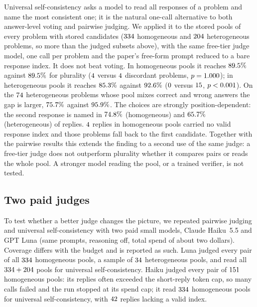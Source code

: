 \documentclass[preprint,11pt,number,sort&compress]{elsarticle}
\begin{document}
Universal self-consistency \citep{chen2023usc} asks a model to read all responses of a problem and name the
most consistent one; it is the natural one-call alternative to both answer-level voting and pairwise
judging. We applied it to the stored pools of every problem with stored candidates ($334$
homogeneous and $204$ heterogeneous problems, so more than the judged subsets above), with the same free-tier judge model, one call per problem and
the paper's free-form prompt reduced to a bare response index. It does not beat voting. In homogeneous
pools it reaches $89.5\%$ against $89.5\%$ for plurality ($4$ versus $4$ discordant
problems, $p=1.000$); in heterogeneous pools it reaches $85.3\%$ against $92.6\%$
($0$ versus $15$, $p<0.001$). On the $74$ heterogeneous problems whose pool
mixes correct and wrong answers the gap is larger, $75.7\%$ against $95.9\%$.
The choices are strongly position-dependent: the second response is named in $74.8\%$
(homogeneous) and $65.7\%$ (heterogeneous) of replies. $4$ replies in homogeneous
pools carried no valid response index and those problems fall back to the first candidate. Together with
the pairwise results this extends the finding to a second use of the same judge: a free-tier judge
does not outperform plurality whether it compares pairs or reads the whole pool. A stronger model
reading the pool, or a trained verifier, is not tested.

\subsection{Two paid judges}
\label{sec:strong}

To test whether a better judge changes the picture, we repeated pairwise judging and universal self-consistency
with two paid small models, Claude Haiku~5.5 and GPT Luna (same prompts, reasoning off, total spend of about two dollars). Coverage
differs with the budget and is reported as such. Luna judged every pair of all $334$ homogeneous pools,
a sample of $34$ heterogeneous pools, and read all $334+204$ pools for universal
self-consistency. Haiku judged every pair of $151$ homogeneous pools: its replies often exceeded the
short-reply token cap, so many calls failed and the run stopped at its spend cap; it read $334$
homogeneous pools for universal self-consistency, with $42$ replies lacking a valid index.
\end{document}
